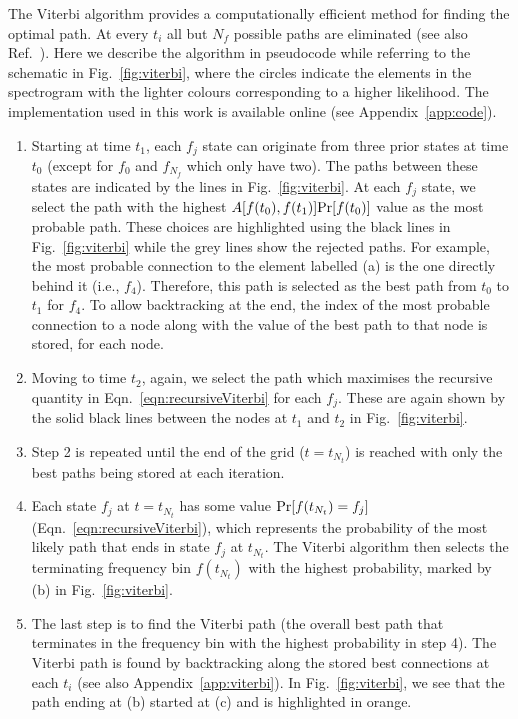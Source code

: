 \documentclass[paper-main.tex]{subfiles}
\begin{document}
The Viterbi algorithm provides a computationally efficient method for finding the optimal path. 
At every $t_i$ all but $N_f$ possible paths are eliminated (see also Ref.~\cite{ScoX1ViterbiO1:2017}). 
Here we describe the algorithm in pseudocode while referring to the schematic in Fig.~\ref{fig:viterbi}, where the circles indicate the elements in the spectrogram with the lighter colours corresponding to a higher likelihood. The implementation used in this work is available online (see Appendix~\ref{app:code}).
\begin{enumerate}
\item Starting at time $t_1$, each $f_j$ state can originate from three prior states at time $t_0$ (except for $f_0$ and $f_{N_f}$ which only have two). The paths between these states are indicated by the lines in Fig.~\ref{fig:viterbi}. At each $f_j$ state, we select the path with the highest $A[f(t_0),f(t_1)] {\rm Pr}[f(t_0)]$ value as the most probable path. These choices are highlighted using the black lines in Fig.~\ref{fig:viterbi} while the grey lines show the rejected paths. For example, the most probable connection to the element labelled (a) is the one directly behind it (i.e., $f_4$). Therefore, this path is selected as the best path from $t_0$ to $t_1$ for $f_4$. To allow backtracking at the end, the index of the most probable connection to a node along with the value of the best path to that node is stored, for each node.

\item Moving to time $t_2$, again, we select the path which maximises the recursive quantity in Eqn.~\ref{eqn:recursiveViterbi} for each $f_j$. These are again shown by the solid black lines between the nodes at $t_1$ and $t_2$ in Fig.~\ref{fig:viterbi}.

\item Step 2 is repeated until the end of the grid ($t=t_{N_t}$) is reached with only the best paths being stored at each iteration. 

\item Each state $f_j$ at $t=t_{N_t}$ has some value ${\rm Pr}[f(t_{N_t})=f_j]$ (Eqn.~\ref{eqn:recursiveViterbi}), which represents the probability of the most likely path that ends in state $f_j$ at $t_{N_t}$. The Viterbi algorithm then selects the terminating frequency bin $f(t_{N_t})$ with the highest probability, marked by (b) in Fig.~\ref{fig:viterbi}.

\item The last step is to find the Viterbi path (the overall best path that terminates in the frequency bin with the highest probability in step 4). The Viterbi path is found by backtracking along the stored best connections at each $t_i$ (see also Appendix~\ref{app:viterbi}). In Fig.~\ref{fig:viterbi}, we see that the path ending at (b) started at (c) and is highlighted in orange.
\end{enumerate}
\end{document}

